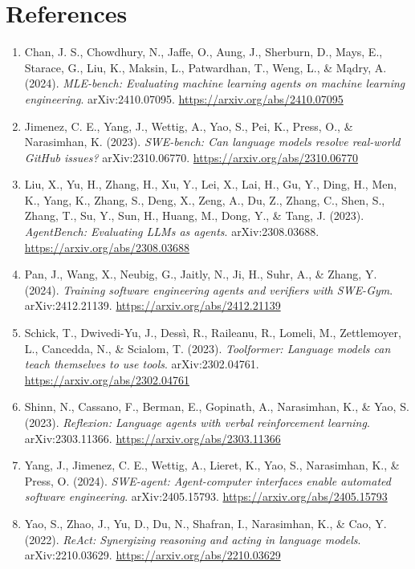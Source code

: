 \documentclass[11pt]{article}
\begin{document}
\section*{References}
\begin{enumerate}
\item Chan, J. S., Chowdhury, N., Jaffe, O., Aung, J., Sherburn, D., Mays, E., Starace, G., Liu, K., Maksin, L., Patwardhan, T., Weng, L., \& Mądry, A. (2024). \textit{MLE-bench: Evaluating machine learning agents on machine learning engineering}. arXiv:2410.07095. \url{https://arxiv.org/abs/2410.07095}
\item Jimenez, C. E., Yang, J., Wettig, A., Yao, S., Pei, K., Press, O., \& Narasimhan, K. (2023). \textit{SWE-bench: Can language models resolve real-world GitHub issues?} arXiv:2310.06770. \url{https://arxiv.org/abs/2310.06770}
\item Liu, X., Yu, H., Zhang, H., Xu, Y., Lei, X., Lai, H., Gu, Y., Ding, H., Men, K., Yang, K., Zhang, S., Deng, X., Zeng, A., Du, Z., Zhang, C., Shen, S., Zhang, T., Su, Y., Sun, H., Huang, M., Dong, Y., \& Tang, J. (2023). \textit{AgentBench: Evaluating LLMs as agents}. arXiv:2308.03688. \url{https://arxiv.org/abs/2308.03688}
\item Pan, J., Wang, X., Neubig, G., Jaitly, N., Ji, H., Suhr, A., \& Zhang, Y. (2024). \textit{Training software engineering agents and verifiers with SWE-Gym}. arXiv:2412.21139. \url{https://arxiv.org/abs/2412.21139}
\item Schick, T., Dwivedi-Yu, J., Dessì, R., Raileanu, R., Lomeli, M., Zettlemoyer, L., Cancedda, N., \& Scialom, T. (2023). \textit{Toolformer: Language models can teach themselves to use tools}. arXiv:2302.04761. \url{https://arxiv.org/abs/2302.04761}
\item Shinn, N., Cassano, F., Berman, E., Gopinath, A., Narasimhan, K., \& Yao, S. (2023). \textit{Reflexion: Language agents with verbal reinforcement learning}. arXiv:2303.11366. \url{https://arxiv.org/abs/2303.11366}
\item Yang, J., Jimenez, C. E., Wettig, A., Lieret, K., Yao, S., Narasimhan, K., \& Press, O. (2024). \textit{SWE-agent: Agent-computer interfaces enable automated software engineering}. arXiv:2405.15793. \url{https://arxiv.org/abs/2405.15793}
\item Yao, S., Zhao, J., Yu, D., Du, N., Shafran, I., Narasimhan, K., \& Cao, Y. (2022). \textit{ReAct: Synergizing reasoning and acting in language models}. arXiv:2210.03629. \url{https://arxiv.org/abs/2210.03629}
\end{enumerate}
\end{document}
